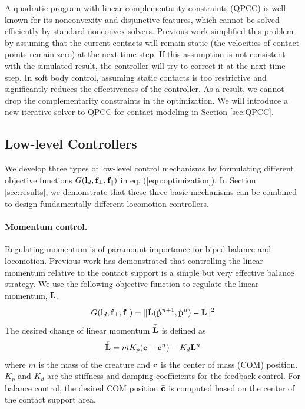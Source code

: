 A quadratic program with linear complementarity constraints (QPCC) is
well known for its nonconvexity and disjunctive features, which cannot
be solved efficiently by standard nonconvex solvers. Previous work
simplified this problem by assuming that the current contacts will
remain static (the velocities of contact points remain zero) at the next time step. If this assumption is not
consistent with the simulated result, the controller will try to
correct it at the next time step. In soft body control, assuming
static contacts is too restrictive and significantly reduces the
effectiveness of the controller. As a result, we cannot drop the
complementarity constraints in the optimization. We will introduce a
new iterative solver to QPCC for contact modeling in Section
\ref{sec:QPCC}.

\subsection{Low-level Controllers}
\label{sec:controller}
We develop three types of low-level control mechanisms by formulating different
objective functions $G(\mathbf{l}_d, \mathbf{f}_\perp, \mathbf{f}_\parallel)$ in
eq. (\ref{eqn:optimization}). In Section \ref{sec:results}, we
demonstrate that these three basic mechanisms can be combined to
design fundamentally different locomotion controllers.

\paragraph{Momentum control.}
Regulating momentum is of paramount importance for biped balance and
locomotion. Previous work \cite{Macchietto:2009} has
demonstrated that controlling the linear momentum relative to the
contact support is a simple but very effective balance strategy. We
use the following objective function to regulate the linear momentum, $\mathbf{L}$.
\begin{equation}
G(\mathbf{l}_d, \mathbf{f}_\perp, \mathbf{f}_\parallel) = \| \dot{\mathbf{L}}(\dot{\mathbf{p}}^{n+1}, \dot{\mathbf{p}}^n) - \bar{\dot{\mathbf{L}}} \|^2
\end{equation}
The desired change of linear momentum $\bar{\dot{\mathbf{L}}}$ is defined as
\begin{equation}
\bar{\dot{\mathbf{L}}} = m K_p (\bar{\mathbf{c}} - \mathbf{c}^n) - K_d \mathbf{L}^n
\end{equation}
where $m$ is the mass of the creature and $\mathbf{c}$ is the center of
mass (COM) position. $K_p$ and $K_d$ are the stiffness and damping
coefficients for the feedback control. For balance control, the
desired COM position $\bar{\mathbf{c}}$ is computed based on the center of
the contact support area.

